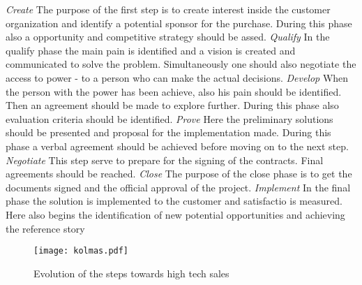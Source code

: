 \documentclass[12pt,a4paper,oneside,pdftex]{report}
\begin{document}
\newline \newline 
\emph{Create}\newline 
The purpose of the first step is to create interest inside the customer organization and identify a potential sponsor for the purchase. During this phase also a opportunity and competitive strategy should be assed. \citep{Eades}\newline \newline
\emph{Qualify}\newline 
In the qualify phase the main pain is identified and a vision is created and communicated to solve the problem. Simultaneously one should also negotiate the access to power - to a person who can make the actual decisions. 
 \citep{Eades}\newline \newline
\emph{Develop}\newline
When the person with the power has been achieve, also his pain should be identified. Then an agreement should be made to explore further. During this phase also evaluation criteria should be identified. 
\citep{Eades} \newline \newline
\emph{Prove}\newline
Here the preliminary solutions should be presented and proposal for the implementation made. During this phase a verbal agreement should be achieved before moving on to the next step.  \citep{Eades}\newline \newline
\emph{Negotiate}\newline
This step serve to prepare for the signing of the contracts. Final agreements should be reached. \citep{Eades}\newline \newline
\emph{Close}\newline
The purpose of the close phase is to get the documents signed and the official approval of the project. \citep{Eades} \newline \newline
\emph{Implement}\newline
In the final phase the solution is implemented to the customer and satisfactio is measured. Here also begins the identification of new potential opportunities and achieving the reference story \citep{Eades}
\newline


\begin{figure}[ht]
  \begin{center}
    \texttt{[image: kolmas.pdf]}
    \caption{Evolution of the steps towards high tech sales}
    \label{fig:kolmas}
  \end{center}
\end{figure}
\end{document}
